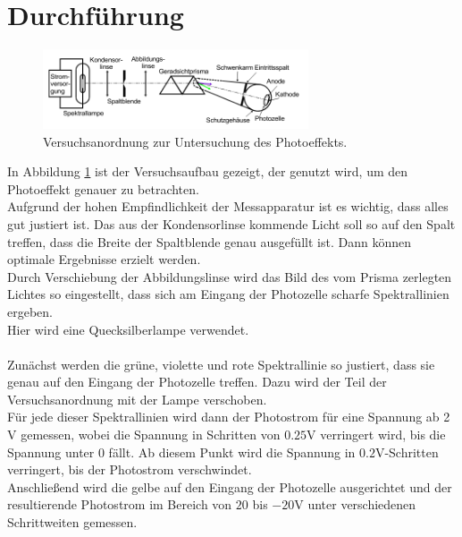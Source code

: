 \section{Durchführung}
\label{sec:Durchführung}

\begin{figure}
    \centering
    \includegraphics[width=0.7\textwidth]{aufbaru.png}
    \caption{Versuchsanordnung zur Untersuchung des Photoeffekts.}
    \label{fig:Versuchsanordnung}
\end{figure}

In Abbildung \ref{fig:Versuchsanordnung} ist der Versuchsaufbau gezeigt, der genutzt wird, um den Photoeffekt genauer zu betrachten.\\
Aufgrund der hohen Empfindlichkeit der Messapparatur ist es wichtig, dass alles gut justiert ist. Das aus der Kondensorlinse kommende Licht soll so auf den Spalt treffen, 
dass die Breite der Spaltblende genau ausgefüllt ist. Dann können optimale Ergebnisse erzielt werden. \\
Durch Verschiebung der Abbildungslinse wird das Bild des vom Prisma zerlegten Lichtes so eingestellt, dass sich am Eingang der Photozelle scharfe Spektrallinien ergeben.\\
Hier wird eine Quecksilberlampe verwendet.\\
\\
\noindent Zunächst werden die grüne, violette und rote Spektrallinie so justiert, dass sie genau auf den Eingang der Photozelle treffen. Dazu wird der Teil der Versuchsanordnung
mit der Lampe verschoben.\\
Für jede dieser Spektrallinien wird dann der Photostrom für eine Spannung ab 2 $\si{\volt}$ gemessen, wobei die Spannung in Schritten von $0.25 \si{\volt}$ verringert wird, bis die Spannung 
unter 0 fällt. Ab diesem Punkt wird die Spannung in $0.2 \si{\volt}$-Schritten verringert, bis der Photostrom verschwindet.\\
Anschließend wird die gelbe auf den Eingang der Photozelle ausgerichtet und der resultierende Photostrom im Bereich von $20$ bis $-20 \si{\volt}$ unter verschiedenen Schrittweiten gemessen.